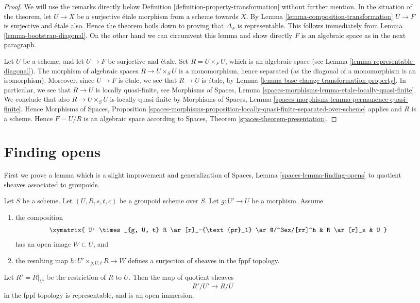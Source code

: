 \begin{proof}
We will use the remarks directly below
Definition \ref{definition-property-transformation}
without further mention.
In the situation of the theorem, let $U \to X$ be a surjective \'etale morphism
from a scheme towards $X$.
By Lemma \ref{lemma-composition-transformation}
$U \to F$ is surjective and \'etale also.
Hence the theorem boils down to proving that
$\Delta_F$ is representable.
This follows immediately from
Lemma \ref{lemma-bootstrap-diagonal}.
On the other hand we can circumvent this lemma and show directly $F$
is an algebraic space as in the next paragraph.

\medskip\noindent
Let $U$ be a scheme, and let $U \to F$ be surjective and \'etale.
Set $R = U \times_F U$, which is an algebraic space (see
Lemma \ref{lemma-representable-diagonal}).
The morphism of algebraic spaces $R \to U \times_S U$ is a monomorphism,
hence separated (as the diagonal of a monomorphism is an isomorphism).
Moreover, since $U \to F$ is \'etale, we see that $R \to U$ is \'etale, by
Lemma \ref{lemma-base-change-transformation-property}.
In particular, we see that $R \to U$ is locally quasi-finite, see
Morphisms of Spaces,
Lemma \ref{spaces-morphisms-lemma-etale-locally-quasi-finite}.
We conclude that also $R \to U \times_S U$ is
locally quasi-finite by
Morphisms of Spaces,
Lemma \ref{spaces-morphisms-lemma-permanence-quasi-finite}.
Hence
Morphisms of Spaces, Proposition
\ref{spaces-morphisms-proposition-locally-quasi-finite-separated-over-scheme}
applies and $R$ is a scheme. Hence $F = U/R$ is an algebraic
space according to
Spaces, Theorem \ref{spaces-theorem-presentation}.
\end{proof}









\section{Finding opens}
\label{section-finding-opens}


\medskip\noindent
First we prove a lemma which is a slight improvement and generalization of
Spaces, Lemma \ref{spaces-lemma-finding-opens}
to quotient sheaves associated to groupoids.

\begin{lemma}
\label{lemma-better-finding-opens}
Let $S$ be a scheme.
Let $(U, R, s, t, c)$ be a groupoid scheme over $S$.
Let $g : U' \to U$ be a morphism.
Assume
\begin{enumerate}
\item the composition
$$
\xymatrix{
U' \times_{g, U, t} R \ar[r]_-{\text{pr}_1} \ar@/^3ex/[rr]^h
& R \ar[r]_s & U
}
$$
has an open image $W \subset U$, and
\item the resulting map $h : U' \times_{g, U, t} R \to W$
defines a surjection of sheaves in the fppf topology.
\end{enumerate}
Let $R' = R|_{U'}$ be the restriction of $R$ to $U$. Then the map
of quotient sheaves
$$
R'/U' \to R/U
$$
in the fppf topology is representable, and is an open immersion.
\end{lemma}

